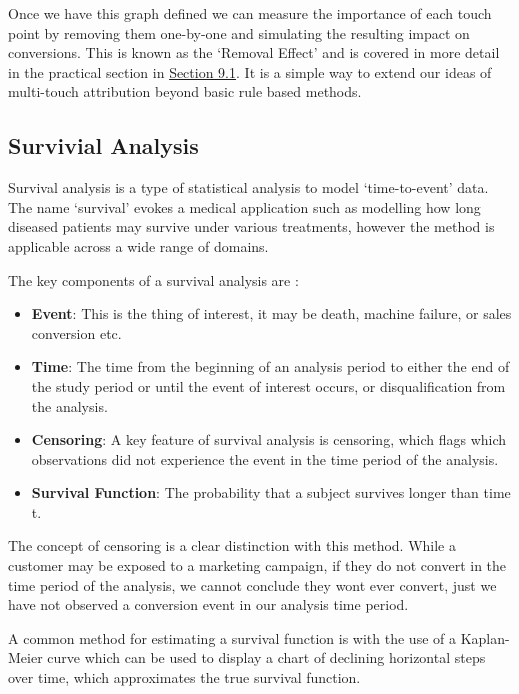 \documentclass[]{book}
\providecommand{\tightlist}{%
  \setlength{\itemsep}{0pt}\setlength{\parskip}{0pt}}
\begin{document}
Once we have this graph defined we can measure the importance of each
touch point by removing them one-by-one and simulating the resulting
impact on conversions. This is known as the `Removal Effect'
\citep{removal2018} and is covered in more detail in the practical
section in \protect\hyperlink{markov-chains}{Section 9.1}. It is a
simple way to extend our ideas of multi-touch attribution beyond basic
rule based methods.

\subsection{Survivial Analysis}\label{survivial-analysis}

Survival analysis is a type of statistical analysis to model
`time-to-event' data. The name `survival' evokes a medical application
such as modelling how long diseased patients may survive under various
treatments, however the method is applicable across a wide range of
domains.

The key components of a survival analysis are
\citep{noauthor_survival_2019}:

\begin{itemize}
\tightlist
\item
  \textbf{Event}: This is the thing of interest, it may be death,
  machine failure, or sales conversion etc.\\
\item
  \textbf{Time}: The time from the beginning of an analysis period to
  either the end of the study period or until the event of interest
  occurs, or disqualification from the analysis.\\
\item
  \textbf{Censoring}: A key feature of survival analysis is censoring,
  which flags which observations did not experience the event in the
  time period of the analysis.\\
\item
  \textbf{Survival Function}: The probability that a subject survives
  longer than time t.
\end{itemize}

The concept of censoring is a clear distinction with this method. While
a customer may be exposed to a marketing campaign, if they do not
convert in the time period of the analysis, we cannot conclude they wont
ever convert, just we have not observed a conversion event in our
analysis time period.

A common method for estimating a survival function is with the use of a
Kaplan-Meier curve \citep{kaplan1958nonparametric} which can be used to
display a chart of declining horizontal steps over time, which
approximates the true survival function.
\end{document}
